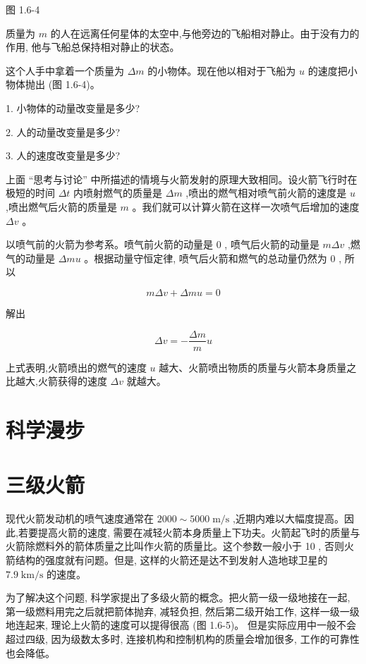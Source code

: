 \documentclass[10pt]{article}
\begin{document}
图 1.6-4

质量为 \(m\) 的人在远离任何星体的太空中,与他旁边的飞船相对静止。由于没有力的作用, 他与飞船总保持相对静止的状态。

这个人手中拿着一个质量为 \({\Delta m}\) 的小物体。现在他以相对于飞船为 \(u\) 的速度把小物体抛出 (图 1.6-4)。

1. 小物体的动量改变量是多少?

2. 人的动量改变量是多少?

3. 人的速度改变量是多少?

上面 “思考与讨论” 中所描述的情境与火箭发射的原理大致相同。设火箭飞行时在极短的时间 \({\Delta t}\) 内喷射燃气的质量是 \({\Delta m}\) ,喷出的燃气相对喷气前火箭的速度是 \(u\) ,喷出燃气后火箭的质量是 \(m\) 。我们就可以计算火箭在这样一次喷气后增加的速度 \({\Delta v}\) 。

以喷气前的火箭为参考系。喷气前火箭的动量是 0 , 喷气后火箭的动量是 \({m\Delta v}\) ,燃气的动量是 \({\Delta mu}\) 。根据动量守恒定律, 喷气后火箭和燃气的总动量仍然为 0 , 所以

\[
{m\Delta v} + {\Delta mu} = 0
\]

解出

\[
{\Delta v} = - \frac{\Delta m}{m}u
\]

上式表明,火箭喷出的燃气的速度 \(u\) 越大、火箭喷出物质的质量与火箭本身质量之比越大,火箭获得的速度 \({\Delta v}\) 就越大。

\section*{科学漫步}

\section*{三级火箭}

现代火箭发动机的喷气速度通常在 \({2000} \sim {5000}\mathrm{\;m}/\mathrm{s}\) ,近期内难以大幅度提高。因此,若要提高火箭的速度, 需要在减轻火箭本身质量上下功夫。火箭起飞时的质量与火箭除燃料外的箭体质量之比叫作火箭的质量比。这个参数一般小于 10 , 否则火箭结构的强度就有问题。但是, 这样的火箭还是达不到发射人造地球卫星的 \({7.9}\mathrm{\;{km}}/\mathrm{s}\) 的速度。

为了解决这个问题, 科学家提出了多级火箭的概念。把火箭一级一级地接在一起, 第一级燃料用完之后就把箭体抛弃, 减轻负担, 然后第二级开始工作, 这样一级一级地连起来, 理论上火箭的速度可以提得很高 (图 1.6-5)。 但是实际应用中一般不会超过四级, 因为级数太多时, 连接机构和控制机构的质量会增加很多, 工作的可靠性也会降低。
\end{document}
